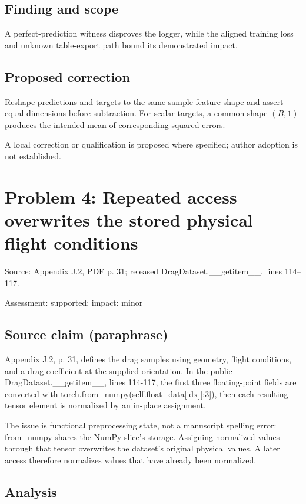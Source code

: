 \documentclass[11pt]{article}
\begin{document}
\subsection*{Finding and scope}

A perfect-prediction witness disproves the logger, while the aligned training loss and unknown table-export path bound its demonstrated impact.

\subsection*{Proposed correction}

Reshape predictions and targets to the same sample-feature shape and assert equal dimensions before subtraction. For scalar targets, a common shape \((B,1)\) produces the intended mean of corresponding squared errors.

A local correction or qualification is proposed where specified; author adoption is not established.

\section*{Problem 4: Repeated access overwrites the stored physical flight conditions}

Source: Appendix J.2, PDF p. 31; released DragDataset.\_\_getitem\_\_, lines 114–117.

Assessment: supported; impact: minor

\subsection*{Source claim (paraphrase)}

Appendix J.2, p. 31, defines the drag samples using geometry, flight conditions, and a drag coefficient at the supplied orientation. In the public DragDataset.\_\_getitem\_\_, lines 114-117, the first three floating-point fields are converted with torch.from\_numpy(self.float\_data[idx][:\(3\)]), then each resulting tensor element is normalized by an in-place assignment.

The issue is functional preprocessing state, not a manuscript spelling error: from\_numpy shares the NumPy slice’s storage. Assigning normalized values through that tensor overwrites the dataset’s original physical values. A later access therefore normalizes values that have already been normalized.

\subsection*{Analysis}
\end{document}
